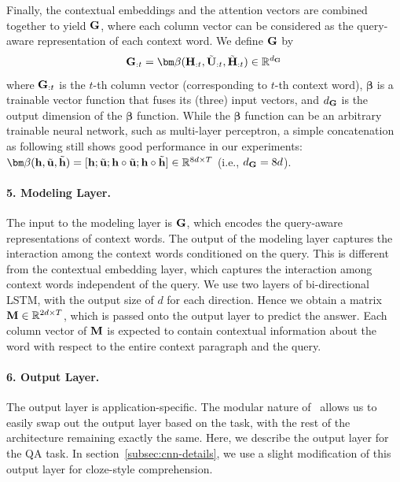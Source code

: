 Finally, the contextual embeddings and the attention vectors are combined together to yield ${\bf G}$, where each column vector can be considered as the query-aware representation of each context word.
We define ${\bf G}$ by
\begin{equation}\label{eqn:flow}
{\bf G}_{:t} = {\bm \beta}({\bf H}_{:t}, \tilde{\bf U}_{:t}, \tilde{\bf H}_{:t}) \in \mathbb{R}^{d_{\bf G}}
\end{equation}
where ${\bf G}_{:t}$ is the $t$-th column vector (corresponding to $t$-th context word),
${\bm \beta}$ is a trainable vector function that fuses its (three) input vectors,
and $d_{\bf G}$ is the output dimension of the ${\bm \beta}$ function.
While the ${\bm \beta}$ function can be an arbitrary trainable neural network, such as multi-layer perceptron, 
a simple concatenation as following still shows good performance in our experiments: ${\bm \beta}({\bf h}, \tilde{\bf u}, \tilde{\bf h}) = [{\bf h}; \tilde{\bf u}; {\bf h} \circ \tilde{\bf u}; {\bf h} \circ \tilde{\bf h}] \in \mathbb{R}^{8d \times T}$ (i.e., $d_{\bf G} = 8d$).

\paragraph{5. Modeling Layer.}\label{subsec:main}
The input to the modeling layer is  ${\bf G}$, which encodes the query-aware representations of context words.
The output of the modeling layer captures the interaction among the context words conditioned on the query.
This is different from the contextual embedding layer, which captures the interaction among context words independent of the query. 
We use two layers of bi-directional LSTM, with the output size of $d$ for each direction. 
Hence we obtain a matrix ${\bf M}\in \mathbb{R}^{2d \times T}$, which is passed onto the output layer to predict the answer. 
Each column vector of ${\bf M}$ is expected to contain contextual information about the word with respect to the entire context paragraph and the query.

\paragraph{6. Output Layer.}\label{subsec:out}
The output layer is application-specific. 
The modular nature of \sysshort\ allows us to easily swap out the output layer based on the task, with the rest of the architecture remaining exactly the same. Here, we describe the output layer for the QA task. In section~\ref{subsec:cnn-details}, we use a slight modification of this output layer for cloze-style comprehension.  %

